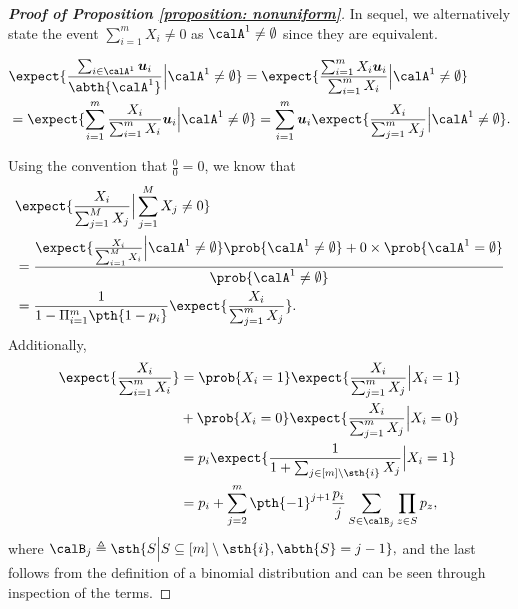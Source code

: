 \documentclass[letterpaper, 10 pt, conference]{ieeeconf}  %
\newcommand{\bu}{{\bm u}}
\begin{document}
\begin{proof}[\bf Proof of Proposition \ref{proposition: nonuniform}]
In sequel, we alternatively state the event $\sum_{i=1}^m X_i \neq 0$ as $\calA^1 \neq \emptyset$ since they are equivalent.
\begin{small}
\begin{align*}
&\expect{\frac{\sum_{i\in \calA^1}\bu_i}{\abth{\calA^1}} \Big| \calA^1 \neq \emptyset} 
 =\expect{\frac{\sum_{i=1}^m X_i \bu_i}{\sum_{i=1}^m X_i} \Big| \calA^1 \neq \emptyset} \\
&= \expect{\sum_{i=1}^m \frac{X_i}{\sum_{i=1}^m X_i} \bu_i \Big| \calA^1 \neq \emptyset} = \sum_{i=1}^m \bu_i\expect{ \frac{X_i}{\sum_{j=1}^m X_j} \Big| \calA^1 \neq \emptyset}.
\end{align*}
\end{small}
Using the convention that $\frac{0}{0}=0$, we know that
\begin{align*}
& \expect{\frac{X_i}{\sum_{j=1}^M X_j}  \Big| \sum_{j=1}^M X_j \neq 0} \\
& = \frac{\expect{\frac{X_i}{\sum_{i=1}^M X_i}  \Big| \calA^1 \neq \emptyset}\prob{\calA^1 \neq \emptyset}  + 0 \times\prob{\calA^1 = \emptyset}}{\prob{\calA^1 \neq \emptyset}}\\
& = \frac{1}{1-\Pi_{i=1}^m\pth{1-p_i}}\expect{ \frac{X_i}{\sum_{j=1}^m X_j}}.
\end{align*}
Additionally, 
\begin{align*}
\expect{ \frac{X_i}{\sum_{i=1}^m X_i}} 
&= \prob{X_i = 1}\expect{ \frac{X_i}{\sum_{j=1}^m X_j}\Big| X_i = 1} \\
&+ \prob{X_i = 0}\expect{ \frac{X_i}{\sum_{j=1}^m X_j} \Big| X_i = 0}\\
&= p_i\expect{ \frac{1}{1 + \sum_{j\in [m]\setminus \sth{i}} X_j}\Big| X_i = 1}\\
&=  p_i 
+\sum_{j=2}^{m} \pth{-1}^{j+1} \frac{p_i}{j}\sum_{ 
S\in \calB_j} \prod_{z\in S} p_z,
\end{align*}
where $\calB_j \triangleq \sth{S \Big|S\subseteq [m]\setminus\sth{i}, \abth{S} = j-1
},$ and the last follows from the definition of a binomial distribution and can be seen through inspection of the terms.
\end{proof}
\end{document}
